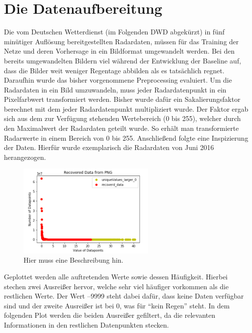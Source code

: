 \section{Die Datenaufbereitung}\label{die datenaufbereitung}
Die vom Deutschen Wetterdienst (im Folgenden DWD abgekürzt) in fünf minütiger Auflösung bereitgestellten Radardaten, müssen für das Training der Netze und deren Vorhersage in ein Bildformat umgewandelt werden.  
Bei den bereits umgewandelten Bildern viel während der Entwicklung der Baseline auf, dass die Bilder weit weniger Regentage abbilden als es tatsächlich regnet. Daraufhin wurde das bisher vorgenommene Preprocessing evaluiert. Um die Radardaten in ein Bild umzuwandeln, muss jeder Radardatenpunkt in ein Pixelfarbwert transformiert werden. Bisher wurde dafür ein Sakalierungsfaktor berechnet mit dem jeder Radardatenpunkt multipliziert wurde. Der Faktor ergab sich aus dem zur Verfügung stehenden Wertebereich (0 bis 255), welcher durch den Maximalwert der Radardaten geteilt wurde. So erhält man transformierte Radarwerte in einem Bereich von 0 bis 255.  
Anschließend folgte eine Inspizierung der Daten. Hierfür wurde exemplarisch die Radardaten von Juni 2016 herangezogen. 

\begin{figure}[H]
 \centering
 \includegraphics[width=0.6\textwidth,angle=0]{abb/datenaufbereitung_beispiel}
 \caption[Datenaufbereitung]{Hier muss eine Beschreibung hin.}
\label{fig:datenaufbereitung}
\end{figure}

Geplottet werden alle auftretenden Werte sowie dessen Häufigkeit. Hierbei stechen zwei Ausreißer hervor, welche sehr viel häufiger vorkommen als die restlichen Werte. Der Wert –9999 steht dabei dafür, dass keine Daten verfügbar sind und der zweite Ausreißer ist bei 0, was für “kein Regen” steht. In dem folgenden Plot werden die beiden Ausreißer gefiltert, da die relevanten Informationen in den restlichen Datenpunkten stecken.   

